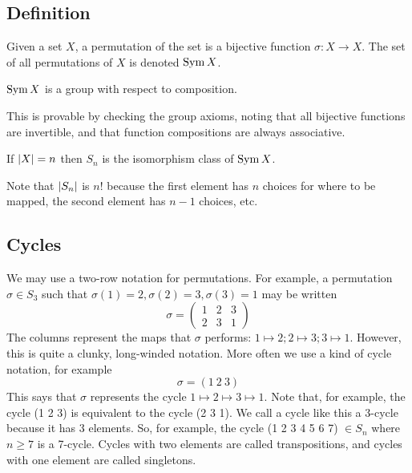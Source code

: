\subsection{Definition}
\begin{definition}
	Given a set \(X\), a permutation of the set is a bijective function \(\sigma: X \to X\).
	The set of all permutations of \(X\) is denoted \(\operatorname{Sym} X\).
\end{definition}
\begin{theorem}
	\(\operatorname{Sym} X\) is a group with respect to composition.
\end{theorem}
This is provable by checking the group axioms, noting that all bijective functions are invertible, and that function compositions are always associative.
\begin{definition}
	If \(\abs{X} = n\) then \(S_n\) is the isomorphism class of \(\operatorname{Sym} X\).
\end{definition}
Note that \(\abs{S_n}\) is \(n!
\) because the first element has \(n\) choices for where to be mapped, the second element has \(n-1\) choices, etc.

\subsection{Cycles}
We may use a two-row notation for permutations.
For example, a permutation \(\sigma \in S_3\) such that \(\sigma(1) = 2, \sigma(2) = 3, \sigma(3) = 1\) may be written
\[
	\sigma = \begin{pmatrix}
		1 & 2 & 3 \\
		2 & 3 & 1
	\end{pmatrix}
\]
The columns represent the maps that \(\sigma\) performs: \(1 \mapsto 2; 2 \mapsto 3; 3 \mapsto 1\).
However, this is quite a clunky, long-winded notation.
More often we use a kind of cycle notation, for example
\[
	\sigma = (1\ 2\ 3)
\]
This says that \(\sigma\) represents the cycle \(1 \mapsto 2 \mapsto 3 \mapsto 1\).
Note that, for example, the cycle (1 2 3) is equivalent to the cycle (2 3 1).
We call a cycle like this a 3-cycle because it has 3 elements.
So, for example, the cycle (1 2 3 4 5 6 7) \(\in S_n\) where \(n \geq 7\) is a 7-cycle.
Cycles with two elements are called transpositions, and cycles with one element are called singletons.


